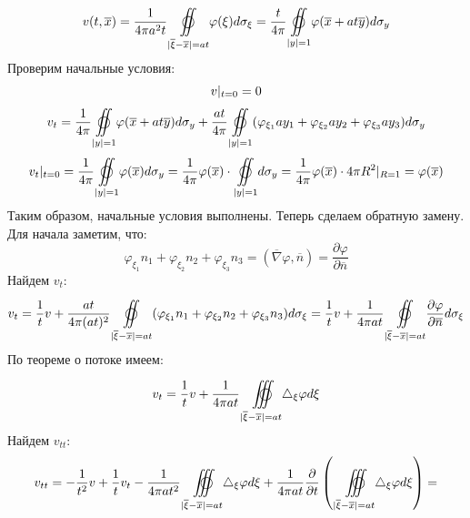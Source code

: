 \begin{Proof}
	$$v (t, \overline{x}) = \frac{1}{4 \pi a^2 t} \underset{| \overline{\xi} - \overline{x}| = at}{\overset{}{\varoiint}} \varphi(\xi) d \sigma_{\xi} = \frac{t}{4 \pi} \underset{|y| = 1}{\overset{}{\varoiint}} \varphi (\overline{x} + at\overline{y}) d\sigma_y$$
	Проверим начальные условия: 
	$$\begin{gathered}
		v|_{t=0} = 0 \\
		v_t = \frac{1}{4\pi}\underset{|y| = 1}{\overset{}{\varoiint}} \varphi (\overline{x} + at\overline{y}) d\sigma_y + \frac{at}{4\pi}\underset{|y| = 1}{\overset{}{\varoiint}} (\varphi_{\xi_1} a y_1 + \varphi_{\xi_2} a y_2 + \varphi_{\xi_3} a y_3) d\sigma_y \\
		v_t|_{t=0} = \frac{1}{4\pi}\underset{|y| = 1}{\overset{}{\varoiint}} \varphi (\overline{x}) d\sigma_y = \frac{1}{4\pi}\varphi (\overline{x}) \cdot\underset{|y| = 1}{\overset{}{\varoiint}}d\sigma_y = \frac{1}{4\pi}\varphi(\overline{x}) \cdot 4\pi R^2|_{R=1} = \varphi (\overline{x})
	\end{gathered}$$
	Таким образом, начальные условия выполнены. Теперь сделаем обратную замену.\\
	Для начала заметим, что:
	$$\varphi_{\xi_1} n_1 + \varphi_{\xi_2} n_2 + \varphi_{\xi_3} n_3 = (\overline{\nabla}\varphi, \overline{n}) = \frac{\partial \varphi}{\partial \overline{n}}$$
	Найдем $v_t$:
	$$\begin{gathered}
		v_t = \frac{1}{t}v + \frac{at}{4\pi (at)^2}\underset{|\overline{\xi} - \overline{x}|=at}{\overset{}{\varoiint}}(\varphi_{\xi_1} n_1 + \varphi_{\xi_2} n_2 + \varphi_{\xi_3} n_3)d \sigma_{\xi} = \frac{1}{t}v + \frac{1}{4\pi at}\underset{|\overline{\xi} - \overline{x}|=at}{\overset{}{\varoiint}}\frac{\partial \varphi}{\partial \overline{n}}d \sigma_{\xi}
	\end{gathered}$$
	По теореме о потоке имеем:
	$$v_t = \frac{1}{t}v + \frac{1}{4\pi at}\underset{|\overline{\xi} - \overline{x}|=at}{\overset{}{\varoiint \hspace{-19.3pt} \int}}\triangle_{\xi}\varphi d \xi$$
	Найдем $v_{tt}$:
	$$\begin{gathered}
		v_{tt} = -\frac{1}{t^2}v + \frac{1}{t}v_t - \frac{1}{4\pi at^2}\underset{|\overline{\xi} - \overline{x}|=at}{\overset{}{\varoiint \hspace{-19.3pt} \int}}\triangle_{\xi}\varphi d \xi + \frac{1}{4\pi at}\frac{\partial}{\partial t}\left( \underset{|\overline{\xi} - \overline{x}|=at}{\overset{}{\varoiint \hspace{-19.3pt} \int}}\triangle_{\xi}\varphi d \xi \right) = \\

\end{gathered}$$
\end{Proof}
